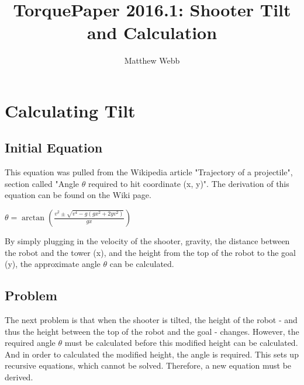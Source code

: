 \documentclass[a4paper,12pt]{report}
\author{Matthew Webb}
\title{TorquePaper 2016.1: Shooter Tilt and Calculation}
\newcommand{\tab}{\hspace{20pt}}
\begin{document}
	\maketitle
	\tableofcontents
	
	\chapter{Calculating Tilt}
	\section{Initial Equation}
	
	\tab This equation was pulled from the Wikipedia article "Trajectory of a projectile", section called "Angle $\theta$ required to hit coordinate (x, y)". The derivation of this equation can be found on the Wiki page.
	\begin{center}
		\(\theta=\arctan{(\frac{v^2 \pm \sqrt{v^4 - g(gx^2 + 2yv^2)}}{gx})}\)
	\end{center}
	\tab By simply plugging in the velocity of the shooter, gravity, the distance between the robot and the tower (x), and the height from the top of the robot to the goal (y), the approximate angle $\theta$ can be calculated.
	\section{Problem}
	\tab The next problem is that when the shooter is tilted, the height of the robot - and thus the height between the top of the robot and the goal - changes. However, the required angle $\theta$ must be calculated before this modified height can be calculated. And in order to calculated the modified height, the angle is required. This sets up recursive equations, which cannot be solved. Therefore, a new equation must be derived.
	
\end{document}
